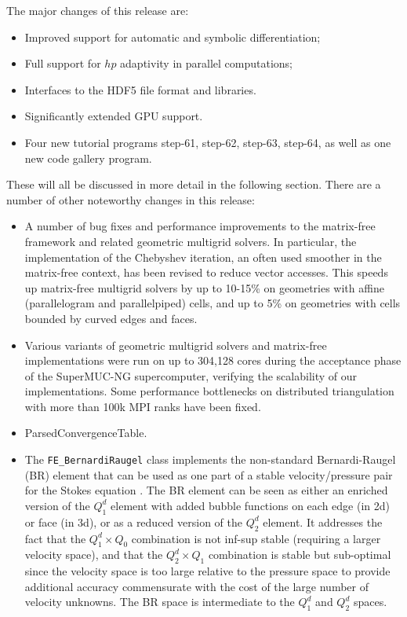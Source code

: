 \documentclass{ansarticle-preprint}
\begin{document}
The major changes of this release are:
\begin{itemize}
\item Improved support for automatic and symbolic differentiation;
\item Full support for $hp$ adaptivity in parallel computations;
\item Interfaces to the HDF5 file format and libraries.
\item Significantly extended GPU support.
\item Four new tutorial programs step-61, step-62, step-63, step-64,
  as well as one new code gallery program.
\end{itemize}
These will all be discussed in more detail in the
following section. There are a number of other noteworthy changes in this release:
\begin{itemize}
\item A number of bug fixes and performance improvements to the
  matrix-free framework and related geometric multigrid solvers. In
  particular, the implementation of the Chebyshev iteration, an often
  used smoother in the matrix-free context, has been revised to reduce
  vector accesses. This speeds up matrix-free
  multigrid solvers by up to 10-15\% on geometries with affine
  (parallelogram and parallelpiped) cells, and up to
  5\% on geometries with cells bounded by curved edges and faces.
\item Various variants of geometric multigrid solvers and matrix-free
  implementations were run on up to 304,128 cores during the acceptance phase of
  the SuperMUC-NG supercomputer, verifying the scalability of our
  implementations. Some performance bottlenecks on distributed triangulation
  with more than 100k MPI ranks have been fixed.
\item ParsedConvergenceTable.
\item The \texttt{FE\_BernardiRaugel} class implements the
  non-standard Bernardi-Raugel (BR) element that can be used as one part of
  a stable velocity/pressure pair for the Stokes equation
  \cite{BR85}. The BR element can be seen as either an enriched
  version of the $Q_1^d$ element with added bubble functions on each
  edge (in 2d) or face (in 3d), or as a reduced version of the $Q_2^d$
  element. It addresses the fact that the $Q_1^d\times Q_0$
  combination is not inf-sup stable (requiring a larger velocity
  space), and that the $Q_2^d\times Q_1$ combination is stable but
  sub-optimal since the velocity space is too large relative to the
  pressure space to provide additional accuracy commensurate with the
  cost of the large number of velocity unknowns. The BR space is
  intermediate to the $Q_1^d$ and $Q_2^d$ spaces.


\end{itemize}
\end{document}
